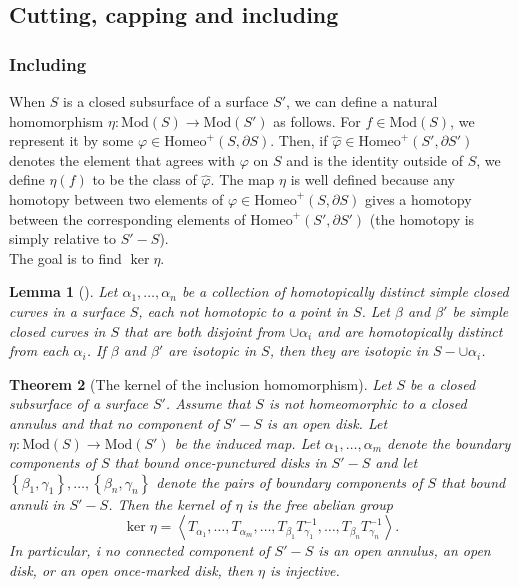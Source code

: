 \documentclass[reqno]{amsart}
\newtheorem{theorem}{Theorem}[section]
\newtheorem{lemma}[theorem]{Lemma}
\theoremstyle{definition}
\theoremstyle{remark}
\newcommand{\Mod}{{\mathrm{Mod}}}
\newcommand{\Homeo}{{\mathrm{Homeo}}}
\begin{document}
\subsection{Cutting, capping and including}

\subsubsection{Including}

When $S$ is a closed subsurface of a surface $S'$, we
can define a natural homomorphism $\eta \colon
\Mod(S) \to \Mod(S')$ as follows. For
$f \in \Mod(S)$, we represent it by some
$\varphi \in \Homeo^{+} \left( S, \partial S \right) $. Then,
if $\hat{\varphi} \in \Homeo^{+} \left( S', \partial S' \right) $ 
denotes the element that agrees with $\varphi $ on $S$ and
is the identity outside of $S$, we define
$\eta (f)$ to be the class of $\hat{\varphi }$. The map
$\eta $ is well defined because any homotopy
between two elements of $\varphi \in \Homeo^{+} (S, \partial
S)$ gives a homotopy between the corresponding elements
of $\Homeo^{+}\left( S', \partial S' \right) $ (the homotopy
is simply relative to $S' - S$).\\
\linebreak
The goal is to find $\ker \eta$.

\begin{lemma}[]
    Let $\alpha_1, \ldots, \alpha_n$  be a collection of
    homotopically distinct simple closed curves in a surface
    $S$, each not homotopic to a point in $S$. Let
    $ \beta $ and $\beta'$ be simple closed curves in $S$ that
    are both disjoint from $\cup  \alpha_i $ and are
    homotopically distinct from each $\alpha_i$. If
    $\beta$ and $\beta'$ are isotopic in $S$, then
    they are isotopic in $S- \cup \alpha_i$.
\end{lemma}

\begin{theorem}[The kernel of the inclusion homomorphism]
    \label{kernel-of-inclusion-homomorphism}
   Let $S$ be a closed subsurface of a surface $S'$.
   Assume that $S$ is not homeomorphic to a closed
   annulus and that no component of $S' - S$ is an open
   disk. Let $\eta \colon \Mod(S) \to \Mod(S')$ be the
   induced map. Let $\alpha_1, \ldots, \alpha_m$ denote
   the boundary components of $S$ that bound once-punctured
   disks in $S' - S$ and let
   $\left\{ \beta_1, \gamma_1 \right\} ,\ldots , 
   \left\{ \beta_n , \gamma_n \right\} $ denote the pairs
   of boundary components of $S$ that bound annuli
   in $S' - S$. Then the kernel of $\eta $ is the free abelian
   group
   \[
   \ker \eta = \left<T_{\alpha_1}, \ldots,
   T_{\alpha_m}, \ldots, T_{\beta_1} T_{\gamma_1}^{-1},
   \ldots, T_{\beta_n}T_{\gamma_n}^{-1}\right>.
   \] 
   In particular, i no connected component of
   $S' - S$ is an open annulus, an open disk, or
   an open once-marked disk, then $\eta$ is injective.
\end{theorem}
\end{document}
